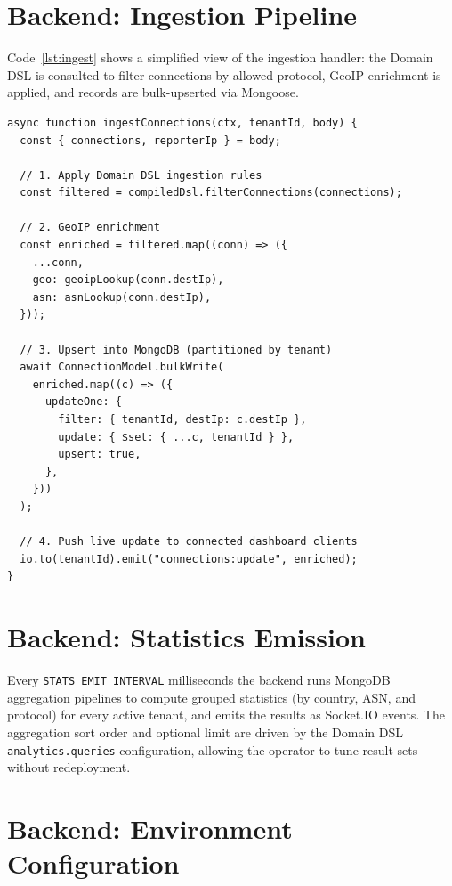 \documentclass[12pt]{report}
\begin{document}
\newpage
\section{Backend: Ingestion Pipeline}

Code~\ref{lst:ingest} shows a simplified view of the ingestion handler:
the Domain DSL is consulted to filter connections by allowed protocol, GeoIP enrichment is
applied, and records are bulk-upserted via Mongoose.

\begin{lstlisting}[language={}, caption={Simplified ingestion pipeline (TypeScript).}, label=lst:ingest]
async function ingestConnections(ctx, tenantId, body) {
  const { connections, reporterIp } = body;

  // 1. Apply Domain DSL ingestion rules
  const filtered = compiledDsl.filterConnections(connections);

  // 2. GeoIP enrichment
  const enriched = filtered.map((conn) => ({
    ...conn,
    geo: geoipLookup(conn.destIp),
    asn: asnLookup(conn.destIp),
  }));

  // 3. Upsert into MongoDB (partitioned by tenant)
  await ConnectionModel.bulkWrite(
    enriched.map((c) => ({
      updateOne: {
        filter: { tenantId, destIp: c.destIp },
        update: { $set: { ...c, tenantId } },
        upsert: true,
      },
    }))
  );

  // 4. Push live update to connected dashboard clients
  io.to(tenantId).emit("connections:update", enriched);
}
\end{lstlisting}

\newpage
\section{Backend: Statistics Emission}

Every \texttt{STATS\_EMIT\_INTERVAL} milliseconds the backend runs MongoDB aggregation
pipelines to compute grouped statistics (by country, ASN, and protocol) for every active
tenant, and emits the results as Socket.IO events. The aggregation sort order and optional
limit are driven by the Domain DSL \texttt{analytics.queries} configuration, allowing the
operator to tune result sets without redeployment.

\section{Backend: Environment Configuration}
\end{document}
